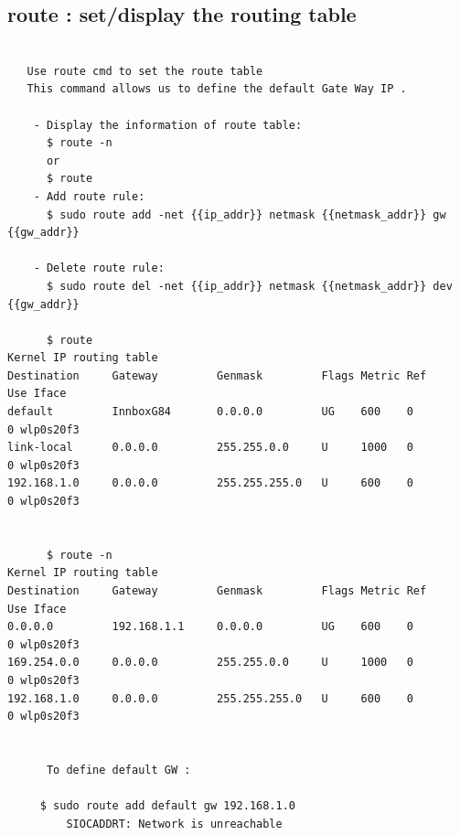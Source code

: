 \documentclass[a4paper,12pt]{article}
\begin{document}
\subsection{route : set/display the routing table}
\begin{verbatim}

   Use route cmd to set the route table
   This command allows us to define the default Gate Way IP .

    - Display the information of route table:
      $ route -n
      or 
      $ route
    - Add route rule:
      $ sudo route add -net {{ip_addr}} netmask {{netmask_addr}} gw {{gw_addr}}

    - Delete route rule:
      $ sudo route del -net {{ip_addr}} netmask {{netmask_addr}} dev {{gw_addr}}
      
      $ route
Kernel IP routing table
Destination     Gateway         Genmask         Flags Metric Ref    Use Iface
default         InnboxG84       0.0.0.0         UG    600    0        0 wlp0s20f3
link-local      0.0.0.0         255.255.0.0     U     1000   0        0 wlp0s20f3
192.168.1.0     0.0.0.0         255.255.255.0   U     600    0        0 wlp0s20f3
   

      $ route -n
Kernel IP routing table
Destination     Gateway         Genmask         Flags Metric Ref    Use Iface
0.0.0.0         192.168.1.1     0.0.0.0         UG    600    0        0 wlp0s20f3
169.254.0.0     0.0.0.0         255.255.0.0     U     1000   0        0 wlp0s20f3
192.168.1.0     0.0.0.0         255.255.255.0   U     600    0        0 wlp0s20f3


      To define default GW : 

     $ sudo route add default gw 192.168.1.0
         SIOCADDRT: Network is unreachable



\end{verbatim}
\end{document}
